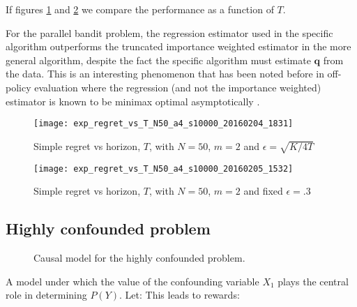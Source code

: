 If figures \ref{fig:simple_vs_T_vary_epsilon} and \ref{fig:simple_vs_T} we compare the performance as a function of $T$. 

For the parallel bandit problem, the regression estimator used in the specific algorithm outperforms the truncated importance weighted estimator in the more 
general algorithm, despite the fact the specific algorithm must estimate $\boldsymbol{q}$ from the data. 
This is an interesting phenomenon that has been noted before in off-policy evaluation where the regression (and not the importance weighted) estimator
is known to be minimax optimal asymptotically \citep{LMS14}.

\begin{figure}
\caption{Simple regret vs horizon, $T$, with $N = 50$, $m=2$ and $\epsilon = \sqrt{K/4T}$}
\label{fig:simple_vs_T_vary_epsilon}
\centering
\texttt{[image: exp\_regret\_vs\_T\_N50\_a4\_s10000\_20160204\_1831]}
\end{figure}

\begin{figure}
\caption{Simple regret vs horizon, $T$, with $N = 50$, $m=2$ and fixed $\epsilon = .3$}
\label{fig:simple_vs_T}
\centering
\texttt{[image: exp\_regret\_vs\_T\_N50\_a4\_s10000\_20160205\_1532]}
\end{figure}


\subsection{Highly confounded problem}

 
\begin{figure}[h]
\centering
\caption{Causal model for the highly confounded problem.}
\label{fig:causalStructure_highly_confounded}
\end{figure}


A model under which the value of the confounding variable $X_1$ plays the central role in determining $P(Y)$.  Let:
This leads to rewards:



